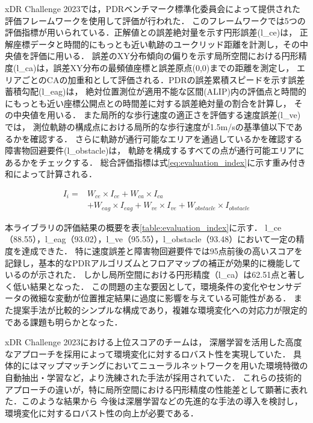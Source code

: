 xDR Challenge 2023では，PDRベンチマーク標準化委員会によって提供された評価フレームワークを使用して評価が行われた．
このフレームワークでは5つの評価指標が用いられている．正解値との誤差絶対量を示す円形誤差(l\_ce)は，
正解座標データと時間的にもっとも近い軌跡のユークリッド距離を計測し，その中央値を評価に用いる．
誤差のXY分布傾向の偏りを示す局所空間における円形精度(l\_ca)は，誤差XY分布の最頻値座標と誤差原点(0,0)までの距離を測定し，
エリアごとのCAの加重和として評価される．PDRの誤差累積スピードを示す誤差蓄積勾配(l\_eag)は，
絶対位置測位が適用不能な区間(ALIP)内の評価点と時間的にもっとも近い座標公開点との時間差に対する誤差絶対量の割合を計算し，
その中央値を用いる．
また局所的な歩行速度の適正さを評価する速度誤差(l\_ve)では，
測位軌跡の構成点における局所的な歩行速度が1.5m/sの基準値以下であるかを確認する．
さらに軌跡が通行可能なエリアを通過しているかを確認する障害物回避要件(l\_obstacle)は，
軌跡を構成するすべての点が通行可能エリアにあるかをチェックする．
総合評価指標は式\ref{eq:evaluation_index}に示す重み付き和によって計算される．

\begin{equation}
	\begin{aligned}
		I_i = & W_{ce} \times I_{ce} + W_{ca} \times I_{ca}                                        \\
		      & + W_{eag} \times I_{eag} + W_{ve} \times I_{ve} + W_{obstacle} \times I_{obstacle}
	\end{aligned}
	\label{eq:evaluation_index}
\end{equation}

本ライブラリの評価結果の概要を表\ref{table:evaluation_index}に示す．
l\_ce（88.55），l\_eag（93.02），l\_ve（95.55），l\_obstacle（93.48）において一定の精度を達成できた．
特に速度誤差と障害物回避要件では95点前後の高いスコアを記録し，基本的なPDRアルゴリズムとフロアマップの補正が効果的に機能しているのが示された．
しかし局所空間における円形精度（l\_ca）は62.51点と著しく低い結果となった．
この問題の主な要因として，環境条件の変化やセンサデータの微細な変動が位置推定結果に過度に影響を与えている可能性がある．
また提案手法が比較的シンプルな構成であり，複雑な環境変化への対応力が限定的である課題も明らかとなった．

xDR Challenge 2023における上位スコアのチームは，
深層学習を活用した高度なアプローチを採用によって環境変化に対するロバスト性を実現していた．
具体的にはマップマッチングにおいてニューラルネットワークを用いた環境特徴の自動抽出・学習など，より洗練された手法が採用されていた．
これらの技術的アプローチの違いが，特に局所空間における円形精度の性能差として顕著に表れた．このような結果から
今後は深層学習などの先進的な手法の導入を検討し，環境変化に対するロバスト性の向上が必要である．


